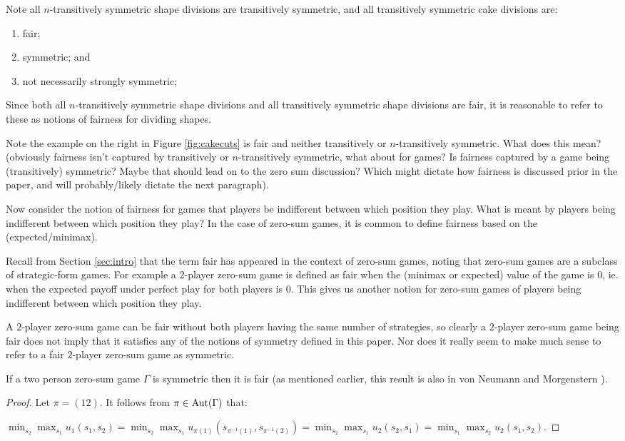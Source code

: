 Note all $n$-transitively symmetric shape divisions are transitively symmetric, and all transitively symmetric cake divisions are:
\begin{enumerate}
	\item fair;
	\item symmetric; and
	\item not necessarily strongly symmetric;
\end{enumerate}

Since both all $n$-transitively symmetric shape divisions and all transitively symmetric shape divisions are fair, it is reasonable to refer to these as notions of fairness for dividing shapes. 

Note the example on the right in Figure \ref{fig:cakecuts} is fair and neither transitively or $n$-transitively symmetric. What does this mean? (obviously fairness isn't captured by transitively or $n$-transitively symmetric, what about for games? Is fairness captured by a game being (transitively) symmetric? Maybe that should lead on to the zero sum discussion? Which might dictate how fairness is discussed prior in the paper, and will probably/likely dictate the next paragraph).

Now consider the notion of fairness for games that players be indifferent between which position they play. What is meant by players being indifferent between which position they play? In the case of zero-sum games, it is common to define fairness based on the (expected/minimax).

Recall from Section \ref{sec:intro} that the term fair has appeared in the context of zero-sum games, noting that zero-sum games are a subclass of strategic-form games. For example a $2$-player zero-sum game is defined as fair when the (minimax or expected) value of the game is $0$, ie. when the expected payoff under perfect play for both players is $0$. This gives us another notion for zero-sum games of players being indifferent between which position they play. 

A $2$-player zero-sum game can be fair without both players having the same number of strategies, so clearly a $2$-player zero-sum game being fair does not imply that it satisfies any of the notions of symmetry defined in this paper. Nor does it really seem to make much sense to refer to a fair $2$-player zero-sum game as symmetric. 

\begin{theorem}
	If a two person zero-sum game $\Gamma$ is symmetric then it is fair (as mentioned earlier, this result is also in von Neumann and Morgenstern \cite[Pages 165-166]{VNM}).
	\begin{proof}
		Let $\pi = (12)$. It follows from $\pi \in \operatorname*{Aut}(\Gamma)$ that:
		
		 $\displaystyle\min_{s_2}\max_{s_1}u_1(s_1, s_2) = \min_{s_2}\max_{s_1}u_{\pi(1)}(s_{\pi^{-1}(1)}, s_{\pi^{-1}(2)}) = \min_{s_2}\max_{s_1}u_2(s_2, s_1) = \min_{s_1}\max_{s_2}u_2(s_1, s_2)$.
	\end{proof}
\end{theorem}

